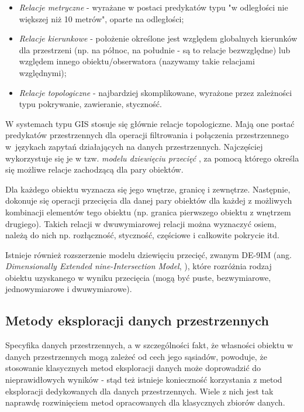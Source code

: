 \documentclass[12pt]{article}
\begin{document}
\begin{itemize}
\item \textit{Relacje metryczne} - wyrażane w postaci predykatów typu "w odległości nie większej niż 10 metrów", oparte na odległości;
\item \textit{Relacje kierunkowe} - położenie określone jest względem globalnych kierunków dla przestrzeni (np. na północ, na południe - są to relacje bezwzględne) lub względem innego obiektu/obserwatora (nazywamy takie relacjami względnymi);
\item \textit{Relacje topologiczne} - najbardziej skomplikowane, wyrażone przez zależności typu pokrywanie, zawieranie, styczność.
\end{itemize}

W systemach typu GIS stosuje się głównie relacje topologiczne. Mają one postać predykatów przestrzennych dla operacji filtrowania i połączenia przestrzennego w~językach zapytań działających na danych przestrzennych. Najczęściej wykorzystuje się je w tzw. \textit{modelu dziewięciu przecięć} \cite{9sec}, za pomocą którego określa się możliwe relacje zachodzącą dla pary obiektów.

Dla każdego obiektu wyznacza się jego wnętrze, granicę i zewnętrze. Następnie, dokonuje się operacji przecięcia dla danej pary obiektów dla każdej z możliwych kombinacji elementów tego obiektu (np. granica pierwszego obiektu z wnętrzem drugiego). Takich relacji w dwuwymiarowej relacji można wyznaczyć osiem, należą do nich np. rozłączność, styczność, częściowe i całkowite pokrycie itd. 

Istnieje również rozszerzenie modelu dziewięciu przecięć, zwanym DE-9IM (ang. \textit{Dimensionally Extended nine-Intersection Model}, \cite{9sec2}), które rozróżnia rodzaj obiektu uzyskanego w wyniku przecięcia (mogą być puste, bezwymiarowe, jednowymiarowe i dwuwymiarowe). 

\subsection{Metody eksploracji danych przestrzennych}

Specyfika danych przestrzennych, a w szczególności fakt, że własności obiektu w danych przestrzennych mogą zależeć od cech jego sąsiadów, powoduje, że stosowanie klasycznych metod eksploracji danych może doprowadzić do nieprawidłowych wyników \cite{klasykchuj1} \cite{klasykchuj2} - stąd też istnieje konieczność korzystania z metod eksploracji dedykowanych dla danych przestrzennych. Wiele z nich jest tak naprawdę rozwinięciem metod opracowanych dla klasycznych zbiorów danych.
\end{document}
